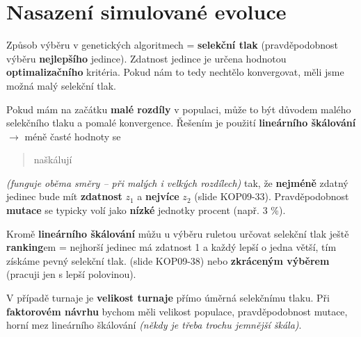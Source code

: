 \section{Nasazení simulované evoluce}

Způsob výběru v genetických algoritmech = \textbf{selekční tlak} (pravděpodobnost výběru \textbf{nejlepšího} jedince). Zdatnost jedince je určena hodnotou \textbf{optimalizačního} kritéria. Pokud nám to tedy nechtělo konvergovat, měli jsme možná malý selekční tlak.

Pokud mám na začátku \textbf{malé rozdíly} v populaci, může to být důvodem malého selekčního tlaku a pomalé konvergence. Řešením je použití \textbf{lineárního škálování} $\to$ méně časté hodnoty se \blockquote{naškálují} \textit{(funguje oběma směry -- při malých i velkých rozdílech)} tak, že \textbf{nejméně} zdatný jedinec bude mít \textbf{zdatnost} $z_1$ a \textbf{nejvíce} $z_2$ (slide KOP09-33). Pravděpodobnost \textbf{mutace} se typicky volí jako \textbf{nízké} jednotky procent (např. 3 \%).

Kromě \textbf{lineárního škálování} můžu u výběru ruletou určovat selekční tlak ještě \textbf{ranking}em = nejhorší jedinec má zdatnost 1 a každý lepší o jedna větší, tím získáme pevný selekční tlak. (slide KOP09-38) nebo \textbf{zkráceným výběrem} (pracuji jen s lepší polovinou).

V případě turnaje je \textbf{velikost turnaje} přímo úměrná selekčnímu tlaku. Při \textbf{faktorovém návrhu} bychom měli velikost populace, pravděpodobnost mutace, horní mez lineárního škálování \textit{(někdy je třeba trochu jemnější škála)}.

